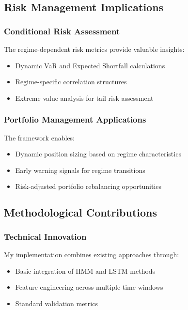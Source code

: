 \subsection{Risk Management Implications}

\subsubsection{Conditional Risk Assessment}
The regime-dependent risk metrics \citep{mcneil2015quantitative} provide valuable insights:
\begin{itemize}
    \item Dynamic VaR and Expected Shortfall calculations \citep{artzner1999coherent}
    \item Regime-specific correlation structures \citep{engle2002dynamic}
    \item Extreme value analysis for tail risk assessment \citep{mcneil2000estimation}
\end{itemize}

\subsubsection{Portfolio Management Applications}
The framework enables:
\begin{itemize}
    \item Dynamic position sizing based on regime characteristics
    \item Early warning signals for regime transitions
    \item Risk-adjusted portfolio rebalancing opportunities
\end{itemize}

\subsection{Methodological Contributions}

\subsubsection{Technical Innovation}
My implementation combines existing approaches through:
\begin{itemize}
    \item Basic integration of HMM and LSTM methods
    \item Feature engineering across multiple time windows
    \item Standard validation metrics
\end{itemize}


